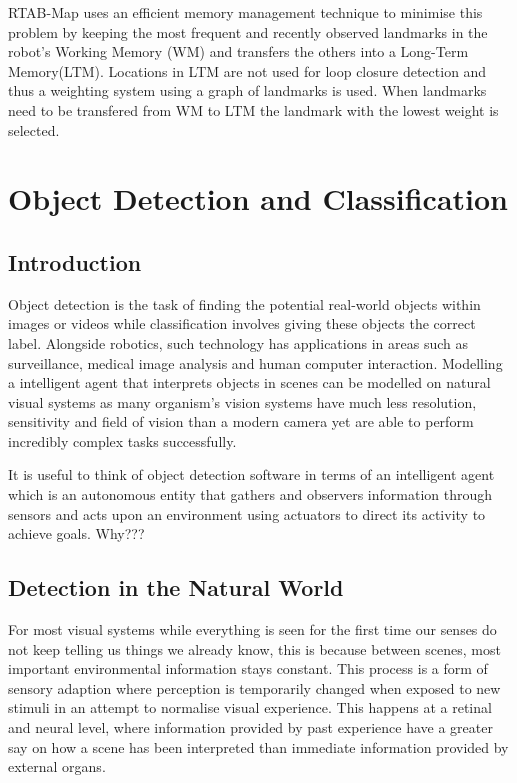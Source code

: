 \documentclass{mproj}
\begin{document}
RTAB-Map uses an efficient memory management technique to minimise this problem by keeping the most frequent and recently observed landmarks in the robot's Working Memory (WM) and transfers the others into a Long-Term Memory(LTM). \cite{labbe13appearance} Locations in LTM are not used for loop closure detection and thus a weighting system using a graph of landmarks is used. When  landmarks need to be transfered from  WM to LTM the landmark with the lowest weight is selected. 


\section{Object Detection and Classification}

\subsection{Introduction}
Object detection is the task of finding the potential real-world objects within images or videos while classification involves giving these objects the correct label. Alongside robotics, such technology has applications in areas such as surveillance, medical image analysis and human computer interaction. Modelling a intelligent agent that interprets objects in scenes can be modelled on natural visual systems as many organism's vision systems have much less resolution, sensitivity and field of vision than a modern camera yet are able to perform incredibly complex tasks successfully. 

It is useful to think of object detection software in terms of an intelligent agent which is an autonomous entity that gathers and observers information through sensors and acts upon an environment using actuators to direct its activity to achieve goals.\cite{Norvig2003} Why???


\subsection{Detection in the Natural World}

For most visual systems while everything is seen for the first time our senses do not keep telling us things we already know, this is because between scenes, most important environmental information stays constant. This process is a form of sensory adaption where perception is temporarily changed when exposed to new stimuli in an attempt to normalise visual experience.\cite{Webster2015} This happens at a retinal and neural level, where information provided by past experience have a greater say on how a scene has been interpreted than immediate information provided by external organs. 
\end{document}
